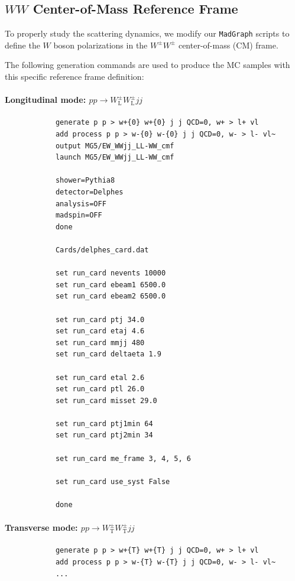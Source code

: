 \documentclass[12pt]{article}
\begin{document}
    \subsection{\texorpdfstring{$WW$}{WW} Center-of-Mass Reference Frame}%
    \label{sub:ww_center_of_mass_reference_frame}

        To properly study the scattering dynamics, we modify our \verb|MadGraph| scripts to define the $W$ boson polarizations in the $W^{\pm}W^{\pm}$ center-of-mass (CM) frame.

        The following generation commands are used to produce the MC samples with this specific reference frame definition:

        \paragraph{Longitudinal mode: $pp \to W^{\pm}_{\text{L}}W^{\pm}_{\text{L}} jj$}
        \begin{lstlisting}
            generate p p > w+{0} w+{0} j j QCD=0, w+ > l+ vl
            add process p p > w-{0} w-{0} j j QCD=0, w- > l- vl~
            output MG5/EW_WWjj_LL-WW_cmf
            launch MG5/EW_WWjj_LL-WW_cmf

            shower=Pythia8
            detector=Delphes
            analysis=OFF
            madspin=OFF
            done

            Cards/delphes_card.dat

            set run_card nevents 10000
            set run_card ebeam1 6500.0
            set run_card ebeam2 6500.0

            set run_card ptj 34.0
            set run_card etaj 4.6
            set run_card mmjj 480
            set run_card deltaeta 1.9

            set run_card etal 2.6
            set run_card ptl 26.0
            set run_card misset 29.0

            set run_card ptj1min 64
            set run_card ptj2min 34

            set run_card me_frame 3, 4, 5, 6

            set run_card use_syst False

            done
        \end{lstlisting}

        \paragraph{Transverse mode: $pp \to W^{\pm}_{\text{T}}W^{\pm}_{\text{T}} jj$}
        \begin{lstlisting}
            generate p p > w+{T} w+{T} j j QCD=0, w+ > l+ vl
            add process p p > w-{T} w-{T} j j QCD=0, w- > l- vl~
            ...
        \end{lstlisting}
\end{document}
